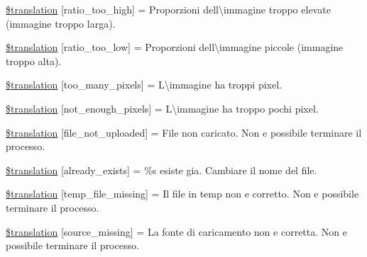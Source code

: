 \begin{DoxyCompactItemize}
\item 
\hyperlink{class_8upload_8it___i_t_8php_a23396f6ce7f31e5e5f1b57580621d982}{\$translation} \mbox{[}\textquotesingle{}ratio\+\_\+too\+\_\+high\textquotesingle{}\mbox{]} = \textquotesingle{}Proporzioni dell\textbackslash{}\textquotesingle{}immagine troppo elevate (immagine troppo larga).\textquotesingle{}
\item 
\hyperlink{class_8upload_8it___i_t_8php_ac533b9a479f056b0b8623e4268f068c2}{\$translation} \mbox{[}\textquotesingle{}ratio\+\_\+too\+\_\+low\textquotesingle{}\mbox{]} = \textquotesingle{}Proporzioni dell\textbackslash{}\textquotesingle{}immagine piccole (immagine troppo alta).\textquotesingle{}
\item 
\hyperlink{class_8upload_8it___i_t_8php_aa4051ef64e94a3f8295c63cf85544016}{\$translation} \mbox{[}\textquotesingle{}too\+\_\+many\+\_\+pixels\textquotesingle{}\mbox{]} = \textquotesingle{}L\textbackslash{}\textquotesingle{}immagine ha troppi pixel.\textquotesingle{}
\item 
\hyperlink{class_8upload_8it___i_t_8php_a1fe342c27ce61f4ff4e0120ba647033e}{\$translation} \mbox{[}\textquotesingle{}not\+\_\+enough\+\_\+pixels\textquotesingle{}\mbox{]} = \textquotesingle{}L\textbackslash{}\textquotesingle{}immagine ha troppo pochi pixel.\textquotesingle{}
\item 
\hyperlink{class_8upload_8it___i_t_8php_a4ce76e7be0b3a03c2b47f6d70c21832e}{\$translation} \mbox{[}\textquotesingle{}file\+\_\+not\+\_\+uploaded\textquotesingle{}\mbox{]} = \textquotesingle{}File non caricato. Non e possibile terminare il processo.\textquotesingle{}
\item 
\hyperlink{class_8upload_8it___i_t_8php_afd84e910217f04139f567c41e292afa5}{\$translation} \mbox{[}\textquotesingle{}already\+\_\+exists\textquotesingle{}\mbox{]} = \textquotesingle{}\%s esiste gia. Cambiare il nome del file.\textquotesingle{}
\item 
\hyperlink{class_8upload_8it___i_t_8php_ab0fa87a88aba2624004581eed0633325}{\$translation} \mbox{[}\textquotesingle{}temp\+\_\+file\+\_\+missing\textquotesingle{}\mbox{]} = \textquotesingle{}Il file in temp non e corretto. Non e possibile terminare il processo.\textquotesingle{}
\item 
\hyperlink{class_8upload_8it___i_t_8php_aceaaf7355acaaf10f0ae60378d03c468}{\$translation} \mbox{[}\textquotesingle{}source\+\_\+missing\textquotesingle{}\mbox{]} = \textquotesingle{}La fonte di caricamento non e corretta. Non e possibile terminare il processo.\textquotesingle{}
\item 

\end{DoxyCompactItemize}
